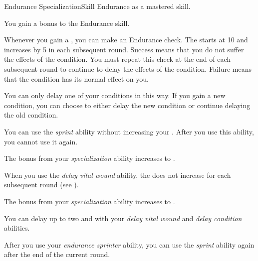     \begin{feat}{Endurance Specialization}{Skill}
        \featpre Endurance as a mastered skill.

         You gain a  bonus to the Endurance skill.

         Whenever you gain a , you can make an Endurance check.
        The  starts at 10 and increases by 5 in each subsequent round.
        Success means that you do not suffer the effects of the condition.
        You must repeat this check at the end of each subsequent round to continue to delay the effects of the condition.
        Failure means that the condition has its normal effect on you.

        You can only delay one of your conditions in this way.
        If you gain a new condition, you can choose to either delay the new condition or continue delaying the old condition.

         You can use the \textit{sprint} ability without increasing your .
        After you use this ability, you  cannot use it again.

         The bonus from your \textit{specialization} ability increases to .

        When you use the \textit{delay vital wound} ability, the  does not increase for each subsequent round (see ).

         The bonus from your \textit{specialization} ability increases to .

         You can delay up to two  and  with your \textit{delay vital wound} and \textit{delay condition} abilities.

         After you use your \textit{endurance sprinter} ability, you can use the \textit{sprint} ability again after the end of the current round.
    \end{feat}


